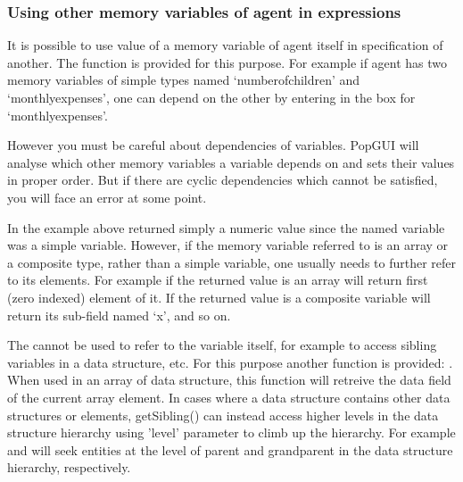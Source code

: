 \documentclass{article}
\begin{document}
\subsubsection{Using other memory variables of agent in expressions}
It is possible to use value of a memory variable of agent itself in specification of another. The  function is provided for this purpose. For example if agent has two memory variables of simple types named `numberofchildren' and `monthlyexpenses', one can depend on the other by entering  in the box for `monthlyexpenses'. 

However you must be careful about dependencies of variables. PopGUI will analyse which other memory variables a variable depends on and sets their values in proper order. But if there are cyclic dependencies which cannot be satisfied, you will face an error at some point.

In the example above  returned simply a numeric value since the named variable was a simple variable. However, if the memory variable referred to is an array or a composite type, rather than a simple variable, one usually needs to further refer to its elements. For example if the returned value is an array  will return first (zero indexed) element of it. If the returned value is a composite variable  will return its sub-field named `x', and so on.

The  cannot be used to refer to the variable itself, for example to access sibling variables in a data structure, etc. For this purpose another function is provided: . When used in an array of data structure, this function will retreive the data field of the current array element. In cases where a data structure contains other data structures or elements, getSibling() can instead access higher levels in the data structure hierarchy using 'level' parameter to climb up the hierarchy. For example  and  will seek entities at the level of parent and grandparent in the data structure hierarchy, respectively.
\end{document}

